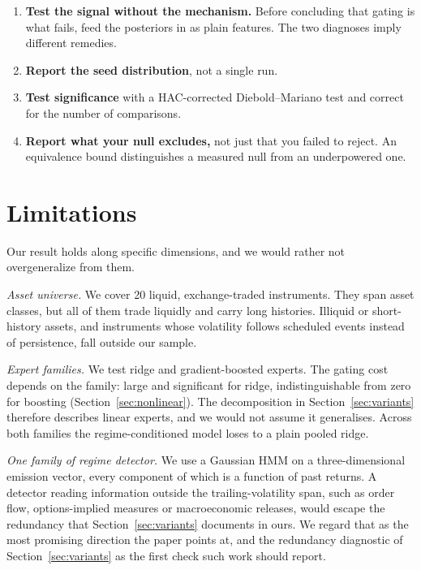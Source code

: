 \documentclass[sigconf,nonacm]{acmart}
\begin{document}
\begin{enumerate}
    conditioning does not help where regimes provably exist, the architecture is
    at fault and no amount of real data will reveal it. If it does help there and
    not on real data, that is evidence about markets rather than about code.
  \item \textbf{Test the signal without the mechanism.} Before concluding that
    gating is what fails, feed the posteriors in as plain features. The two
    diagnoses imply different remedies.
  \item \textbf{Report the seed distribution}, not a single run.
  \item \textbf{Test significance} with a HAC-corrected Diebold--Mariano test and
    correct for the number of comparisons.
  \item \textbf{Report what your null excludes,} not just that you failed to
    reject. An equivalence bound distinguishes a measured null from an
    underpowered one.
\end{enumerate}

\section{Limitations}

Our result holds along specific dimensions, and we would rather not
overgeneralize from them.

\emph{Asset universe.} We cover 20 liquid, exchange-traded instruments. They span
asset classes, but all of them trade liquidly and carry long histories. Illiquid
or short-history assets, and instruments whose volatility follows scheduled
events instead of persistence, fall outside our sample.

\emph{Expert families.} We test ridge and gradient-boosted experts. The gating
cost depends on the family: large and significant for ridge, indistinguishable
from zero for boosting (Section~\ref{sec:nonlinear}). The decomposition in
Section~\ref{sec:variants} therefore describes linear experts, and we would not
assume it generalises. Across both families the regime-conditioned model loses to
a plain pooled ridge.

\emph{One family of regime detector.} We use a Gaussian HMM on a
three-dimensional emission vector, every component of which is a function of past
returns. A detector reading information outside the trailing-volatility span,
such as order flow, options-implied measures or macroeconomic releases, would
escape the redundancy that Section~\ref{sec:variants} documents in ours. We
regard that as the most promising direction the paper points at, and the
redundancy diagnostic of Section~\ref{sec:variants} as the first check such work
should report.
\end{document}
